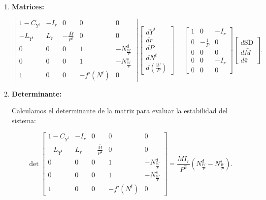 \documentclass[
  doc,
  floatsintext,
  longtable,
  a4paper,
  nolmodern,
  notxfonts,
  notimes,
  12pt,
  colorlinks=true,linkcolor=blue,citecolor=blue,urlcolor=blue]{apa7}
\begin{document}
\begin{enumerate}
  \[
  \begin{aligned}
  (1 - C_{Y^t}) dY^t - I_r dr &= -I_r d\bar{\pi} + d\bar{\mathrm{SD}}, \\
  -L_{Y^t} dY^t + L_r dr - \frac{\bar{M}}{P^2} dP &= -\frac{d\bar{M}}{P}, \\
  dN^t - N^d_{\frac{W}{P}} d \left( \frac{W}{P} \right) &= 0, \\
  dN^t - N^s_{\frac{W}{P}} d \left( \frac{W}{P} \right) &= 0, \\
  dY^t - f'(N^t) dN^t &= 0.
  \end{aligned}
  \]
\item
  \textbf{Matrices:}

  \[
  \begin{bmatrix}
  1 - C_{Y^t} & -I_r & 0 & 0 & 0 \\
  -L_{Y^t} & L_r & -\frac{\bar{M}}{P^2} & 0 & 0 \\
  0 & 0 & 0 & 1 & -N^d_{\frac{W}{P}} \\
  0 & 0 & 0 & 1 & -N^s_{\frac{W}{P}} \\
  1 & 0 & 0 & -f'(N^t) & 0
  \end{bmatrix}
  \begin{bmatrix}
  dY^t \\
  dr \\
  dP \\
  dN^t \\
  d \left( \frac{W}{P} \right)
  \end{bmatrix}
  =
  \begin{bmatrix}
  1 & 0 & -I_r \\
  0 & -\frac{1}{P} & 0 \\
  0 & 0 & 0 \\
  0 & 0 &-I_r \\
  0 & 0 & 0
  \end{bmatrix}
  \begin{bmatrix}
  d\bar{\mathrm{SD}} \\
  d\bar{M} \\
  d\bar{\pi}
  \end{bmatrix}.
  \]
\item
  \textbf{Determinante:}

  Calculamos el determinante de la matriz para evaluar la estabilidad
  del sistema:

  \[
  \det \begin{bmatrix}
  1 - C_{Y^t} & -I_r & 0 & 0 & 0 \\
  -L_{Y^t} & L_r & -\frac{\bar{M}}{P^2} & 0 & 0 \\
  0 & 0 & 0 & 1 & -N^d_{\frac{W}{P}} \\
  0 & 0 & 0 & 1 & -N^s_{\frac{W}{P}} \\
  1 & 0 & 0 & -f'(N^t) & 0
  \end{bmatrix} = \frac{\bar{M} I_r}{P^2} \left( N^d_{\frac{W}{P}} - N^s_{\frac{W}{P}} \right).
  \]


\end{enumerate}
\end{document}
